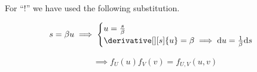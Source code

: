 \begin{solution}
\begin{enumerate}[label = (\alph*)]
    For \enquote{$!$} we have used the following substitution.

    \begin{align*}
        s = \beta u
        \implies
        \begin{cases}
            u = \frac{s}{\beta} \\
            \derivative[][s]{u} = \beta \implies \mathrm d u = \frac{1}{\beta} \mathrm d s
        \end{cases}
    \end{align*}

    \begin{align*}
        \implies
        f_U(u) f_V(v) = f_{U, V}(u, v)        
    \end{align*}

\end{enumerate}

\end{solution}


